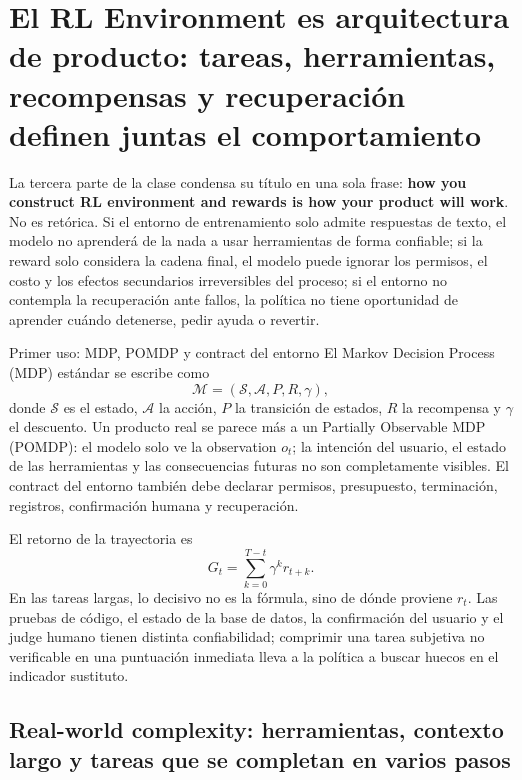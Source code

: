 \section{El RL Environment es arquitectura de producto: tareas, herramientas, recompensas y recuperación definen juntas el comportamiento}

La tercera parte de la clase condensa su título en una sola frase: \textbf{how you construct RL environment and rewards is how your product will work}. No es retórica. Si el entorno de entrenamiento solo admite respuestas de texto, el modelo no aprenderá de la nada a usar herramientas de forma confiable; si la reward solo considera la cadena final, el modelo puede ignorar los permisos, el costo y los efectos secundarios irreversibles del proceso; si el entorno no contempla la recuperación ante fallos, la política no tiene oportunidad de aprender cuándo detenerse, pedir ayuda o revertir.


\begin{importantbox}{Primer uso: MDP, POMDP y contract del entorno}
El Markov Decision Process (MDP) estándar se escribe como
\[
\mathcal{M}=(\mathcal{S},\mathcal{A},P,R,\gamma),
\]
donde $\mathcal{S}$ es el estado, $\mathcal{A}$ la acción, $P$ la transición de estados, $R$ la recompensa y $\gamma$ el descuento. Un producto real se parece más a un Partially Observable MDP (POMDP): el modelo solo ve la observation $o_t$; la intención del usuario, el estado de las herramientas y las consecuencias futuras no son completamente visibles. El contract del entorno también debe declarar permisos, presupuesto, terminación, registros, confirmación humana y recuperación.
\end{importantbox}

El retorno de la trayectoria es
\[
G_t=\sum_{k=0}^{T-t}\gamma^k r_{t+k}.
\]
En las tareas largas, lo decisivo no es la fórmula, sino de dónde proviene $r_t$. Las pruebas de código, el estado de la base de datos, la confirmación del usuario y el judge humano tienen distinta confiabilidad; comprimir una tarea subjetiva no verificable en una puntuación inmediata lleva a la política a buscar huecos en el indicador sustituto.

\subsection{Real-world complexity: herramientas, contexto largo y tareas que se completan en varios pasos}

